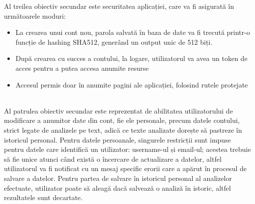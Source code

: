Al treilea obiectiv secundar este securitatea aplicației, care va fi asigurată în următoarele moduri: 
\begin{itemize}
    \setlength\itemsep{0.5em}
    \item La crearea unui cont nou, parola salvată în baza de date va fi trecută printr-o funcție de hashing SHA512, generând un output unic de 512 biți.
    \item După crearea cu succes a contului, la logare, utilizatorul va avea un token de acces pentru a putea accesa anumite resurse
    \item Accesul permis doar în anumite pagini ale aplicației, folosind rutele protejate
\end{itemize}
\ \\

Al patrulea obiectiv secundar este reprezentat de abilitatea utilizatorului de modificare a anumitor date din cont, fie ele personale, precum datele contului, strict legate de analizele pe text, adică ce texte analizate 
dorește să pastreze în istoricul personal.
Pentru datele persoanale, singurele restricții sunt impuse pentru datele care identifică un utilizator: username-ul și email-ul; acestea trebuie să fie unice atunci când există o încercare de actualizare a datelor, altfel 
utilizatorul va fi notificat cu un mesaj specific erorii care a apărut în procesul de salvare a datelor.
Pentru partea de salvare în istoricul personal al analizelor efectuate, utilizator poate să aleagă dacă salvează o analiză în istoric, altfel rezultatele sunt decartate.
\\

